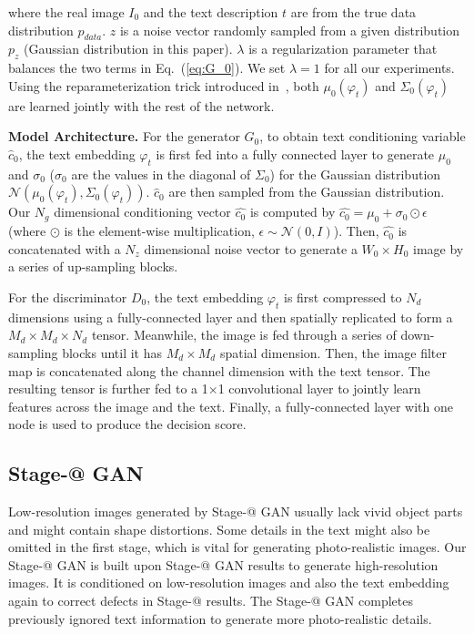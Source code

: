 where the real image $I_0$ and the text description $t$ are from the true data distribution $p_{data}$. $z$ is a noise vector randomly sampled from a given distribution $p_z$ (Gaussian distribution in this paper). 
$\lambda$ is a regularization parameter that balances the two terms in Eq.~(\ref{eq:G_0}).
We set $\lambda=1$ for all our experiments. Using the reparameterization trick introduced in~\cite{KingmaW14}, both $\mu_0(\varphi_{t})$ and $\Sigma_0(\varphi_{t})$ are learned jointly with the rest of the network.  

\textbf{Model Architecture. } For the generator $G_0$, to obtain text conditioning variable $\hat{c}_0$, the text embedding $\varphi_{t}$ is first fed into a fully connected layer to generate $\mu_0$ and $\sigma_0$ ($\sigma_0$ are the values in the diagonal of $\Sigma_0$) for the Gaussian distribution $\mathcal{N}(\mu_0(\varphi_{t}), \Sigma_0(\varphi_{t}))$. $\hat{c}_0$ are then sampled from the Gaussian distribution. Our $N_g$ dimensional conditioning vector $\hat{c_0}$ is computed by $\hat{c_0} = \mu_0 + \sigma_0 \odot \epsilon$ (where $\odot$ is the element-wise multiplication, $\epsilon  \sim \mathcal{N}(0, I)$). Then, $\hat{c_0}$ is concatenated with a $N_z$ dimensional noise vector to generate a $W_{0} \times H_{0}$ image by a series of up-sampling blocks.  

For the discriminator $D_0$, the text embedding $\varphi_{t}$ is first compressed to $N_d$ dimensions using a fully-connected layer and then spatially replicated to form a $M_d \times M_d \times N_d$ tensor. Meanwhile, the image is fed through a series of down-sampling blocks until it has $M_d \times M_d$ spatial dimension. Then, the image filter map is concatenated along the channel dimension with the text tensor. The resulting tensor is further fed to a 1$\times$1 convolutional layer to jointly learn features across the image and the text. Finally, a fully-connected layer with one node is used to produce the decision score. 

\subsection{Stage-\expandafter\@slowromancap{}@ GAN}

Low-resolution images generated by Stage-\expandafter\@slowromancap{}@ GAN usually lack vivid object parts and might contain shape distortions. Some details in the text might also be omitted in the first stage, which is vital for generating photo-realistic images. Our Stage-\expandafter\@slowromancap{}@ GAN is built upon Stage-\expandafter\@slowromancap{}@ GAN results to generate high-resolution images. It is conditioned on low-resolution images and also the text embedding again to correct defects in Stage-\expandafter\@slowromancap{}@ results. The Stage-\expandafter\@slowromancap{}@ GAN completes previously ignored text information to generate more photo-realistic details.

